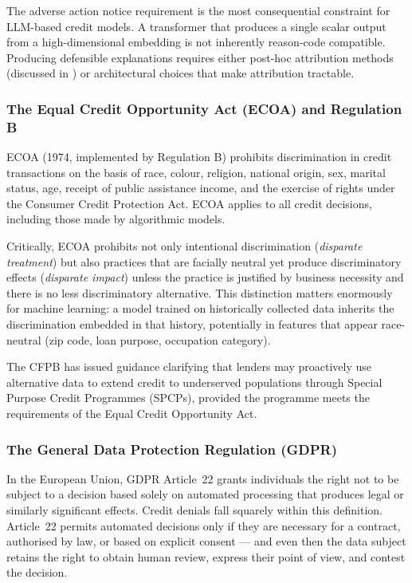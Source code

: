 \begin{context}
The adverse action notice requirement is the most consequential constraint for LLM-based credit models. A transformer that produces a single scalar output from a high-dimensional embedding is not inherently reason-code compatible. Producing defensible explanations requires either post-hoc attribution methods (discussed in ) or architectural choices that make attribution tractable.

\subsubsection*{The Equal Credit Opportunity Act (ECOA) and Regulation B}

ECOA (1974, implemented by Regulation B) prohibits discrimination in credit transactions on the basis of race, colour, religion, national origin, sex, marital status, age, receipt of public assistance income, and the exercise of rights under the Consumer Credit Protection Act. ECOA applies to all credit decisions, including those made by algorithmic models.

Critically, ECOA prohibits not only intentional discrimination (\emph{disparate treatment}) but also practices that are facially neutral yet produce discriminatory effects (\emph{disparate impact}) unless the practice is justified by business necessity and there is no less discriminatory alternative. This distinction matters enormously for machine learning: a model trained on historically collected data inherits the discrimination embedded in that history, potentially in features that appear race-neutral (zip code, loan purpose, occupation category).

The CFPB has issued guidance clarifying that lenders may proactively use alternative data to extend credit to underserved populations through Special Purpose Credit Programmes (SPCPs), provided the programme meets the requirements of the Equal Credit Opportunity Act.

\subsubsection*{The General Data Protection Regulation (GDPR)}

In the European Union, GDPR Article~22 grants individuals the right not to be subject to a decision based solely on automated processing that produces legal or similarly significant effects. Credit denials fall squarely within this definition. Article~22 permits automated decisions only if they are necessary for a contract, authorised by law, or based on explicit consent --- and even then the data subject retains the right to obtain human review, express their point of view, and contest the decision.


\end{context}
